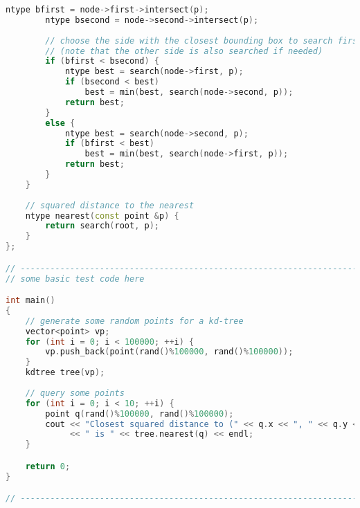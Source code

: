 \begin{lstlisting}[language=C++]
        ntype bfirst = node->first->intersect(p);
        ntype bsecond = node->second->intersect(p);
        
        // choose the side with the closest bounding box to search first
        // (note that the other side is also searched if needed)
        if (bfirst < bsecond) {
            ntype best = search(node->first, p);
            if (bsecond < best)
                best = min(best, search(node->second, p));
            return best;
        }
        else {
            ntype best = search(node->second, p);
            if (bfirst < best)
                best = min(best, search(node->first, p));
            return best;
        }
    }
    
    // squared distance to the nearest 
    ntype nearest(const point &p) {
        return search(root, p);
    }
};

// --------------------------------------------------------------------------
// some basic test code here

int main()
{
    // generate some random points for a kd-tree
    vector<point> vp;
    for (int i = 0; i < 100000; ++i) {
        vp.push_back(point(rand()%100000, rand()%100000));
    }
    kdtree tree(vp);
    
    // query some points
    for (int i = 0; i < 10; ++i) {
        point q(rand()%100000, rand()%100000);
        cout << "Closest squared distance to (" << q.x << ", " << q.y << ")"
             << " is " << tree.nearest(q) << endl;
    }    

    return 0;
}

// --------------------------------------------------------------------------

\end{lstlisting}
